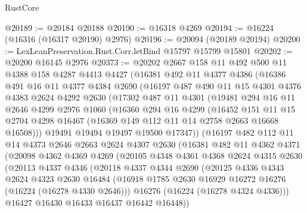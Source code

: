 \begin{lexlean}{RustCore}
\begin{coremodule}
@20189 := @20184 @20188
@20190 := @16318 @4269
@20194 := @16224 (@16316 (@16317 @20190) @2976)
@20196 := @20094 (@20189 @20194)
@20200 := LexLeanPreservation.Rust.Corr.letBind @15797 @15799 @15801
@20202 := @20200 @16145 @2976
@20373 := @20202
    @2667
    @158
    @11
    @492
    @500
    @11
    @4388
    @158
    @4287
    @4413
    @4427
    (@16381
      @492
      @11
      @4377
      @4386
      (@16386
        @491
        @16
        @11
        @4377
        @4384
        @2690
        (@16197
          @487
          @490
          @11
          @15
          @4301
          @4376
          @4383
          @2624
          @4292
          @2630
          (@17302
            @487
            @11
            @4301
            (@19481
              @294
              @16
              @11
              @2646
              @4299
              @2976
              @1060
              (@16360
                @294
                @16
                @4299
                (@16452
                  @151
                  @11
                  @15
                  @2704
                  @4298
                  @16467
                  (@16369 @149 @112 @11 @14 @2758 @2663 @16668 @16508)))
              @19491
              @19494
              @19497
              @19500
              @17347))
          (@16197
            @482
            @112
            @11
            @14
            @4373
            @2646
            @2663
            @2624
            @4307
            @2630
            (@16381
              @482
              @11
              @4362
              @4371
              (@20098
                @4362
                @4369
                @4269
                (@20105
                  @4348
                  @4361
                  @4368
                  @2624
                  @4315
                  @2630
                  (@20113
                    @4337
                    @4346
                    (@20118
                      @4337
                      @4344
                      @2690
                      (@20125
                        @4336
                        @4343
                        @2624
                        @4323
                        @2630
                        @16484
                        (@16918 @1785 @2630 @16929 @16272 @16276 (@16224 (@16278 @4330 @2646)))
                        @16276
                        (@16224 (@16278 @4324 @4336)))
                      @16427
                      @16430
                      @16433
                      @16437
                      @16442
                      @16448))

\end{coremodule}
\end{lexlean}

